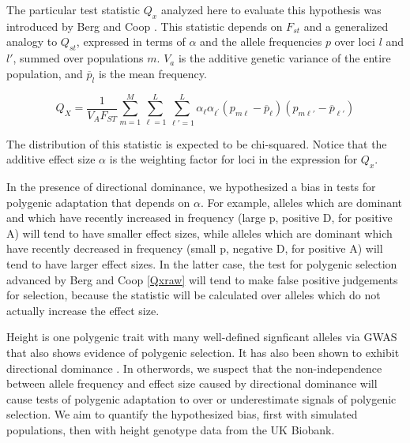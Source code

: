\documentclass[a4paper,12pt]{article}
\begin{document}
The particular test statistic $Q_x$ analyzed here to evaluate this
hypothesis was introduced by Berg and Coop \cite{berg}. This statistic depends on $F_{st}$ and
a generalized analogy to $Q_{st}$, expressed in terms of $\alpha$ and
the allele frequencies $p$ over loci $l$ and $l'$, summed over
populations $m$. $V_a$ is the additive genetic variance of the entire
population, and $\overline{p}_l$ is the mean frequency.

\begin{equation} \label{Qxraw}
  Q_X = \frac{1}{V_A F_{ST}} \sum_{m=1}^M \sum_{\ell=1}^L \sum_{\ell\prime=1}^L \alpha_{\ell} \alpha_{\ell^{\prime}}\left(p_{m\ell} - \overline{p}_\ell \right)\left(p_{m \ell\prime} - \overline{p}_{\ell\prime}\right)
\end{equation}


The distribution of this statistic is expected to be chi-squared. Notice that the additive effect size $\alpha$ is the weighting factor for loci in the
expression for $Q_x$. 

In the presence of directional dominance, we hypothesized a bias in
tests for polygenic adaptation that depends on $\alpha$. For example, alleles which are dominant and which have recently increased in
frequency (large p, positive D, for positive A) will tend to have smaller effect sizes, while
alleles which are dominant which have recently decreased in frequency
(small p, negative D, for positive A) will tend to have larger effect sizes. In the
latter case, the test for polygenic selection advanced by Berg and Coop
\eqref{Qxraw} will tend to make false positive judgements for
selection, because the statistic will be calculated over alleles which
do not actually increase the effect size.

Height is one polygenic trait with many well-defined signficant
alleles via GWAS \cite{heightselection} that also shows evidence of polygenic selection. It has also been shown to exhibit
directional dominance \cite{heightdirectdom}. In otherwords, we
suspect that the non-independence between allele frequency and effect
size caused by directional dominance will cause tests of polygenic
adaptation to over or underestimate signals of polygenic selection. We aim to quantify the
hypothesized bias, first with simulated populations, then with height genotype data from the UK Biobank.
\end{document}
